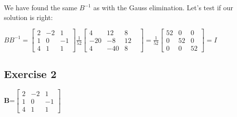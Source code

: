\documentclass[12pt]{article}
\begin{document}
We have found the same $B^{-1}$ as with the Gauss elimination. Let's test if our solution is right: \\

\begin{center}
$BB^{-1}=\begin{bmatrix}
2 & -2 & 1 \\
1 & 0 & -1 \\
4 & 1 & 1
\end{bmatrix}\frac{1}{52}
\begin{bmatrix}
4 & 12 & 8 & \\
-20 & -8 & 12 \\
4 & -40 & 8
\end{bmatrix} = \frac{1}{52}
\begin{bmatrix}
52 & 0 & 0 \\
0 & 52 & 0 \\
0 & 0 & 52
\end{bmatrix} = I
$
\end{center}

\subsection{Exercise 2}

\begin{center}
\textbf{B}=$\begin{bmatrix}
2 & -2 & 1 \\
1 & 0 & -1 \\
4 & 1 & 1
\end{bmatrix}$
\end{center}\\
\end{document}
